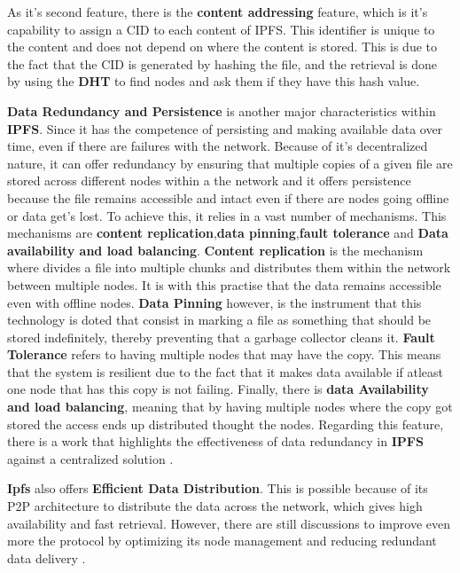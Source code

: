 As it's second feature, there is the \textbf{content addressing} feature, which is it's capability to assign a CID to each content of IPFS. This identifier is unique to the content and does not depend on where the content is stored. This is due to the fact that the CID is generated by hashing the file, and the retrieval is done by using the \textbf{DHT} to find nodes and ask them if they have this hash value.

\textbf{Data Redundancy and Persistence} is another major characteristics within \textbf{IPFS}. Since it has the competence of persisting and making available data over time, even if there are failures with the network. Because of it's decentralized nature, it can offer redundancy by ensuring that multiple copies of a given file are stored across different nodes within a the network and it offers persistence because the file remains accessible and intact even if there are nodes going offline or data get's lost. To achieve this, it relies in a vast number of mechanisms. This mechanisms are \textbf{content replication},\textbf{data pinning},\textbf{fault tolerance} and \textbf{Data availability and load balancing}. \textbf{Content replication} is the mechanism where  divides a file into multiple chunks and distributes them within the network between multiple nodes. It is with this practise that the data remains accessible even with offline nodes. \textbf{Data Pinning} however, is the instrument that this technology is doted that consist in marking a file as something that should be stored indefinitely, thereby preventing that a garbage collector cleans it. \textbf{Fault Tolerance} refers to having multiple nodes that may have the copy. This means that the system is resilient due to the fact that it makes data available if atleast one node that has this copy is not failing. Finally, there is \textbf{data Availability and load balancing}, meaning that by having multiple nodes where the copy got stored the access ends up distributed thought the nodes. Regarding this feature, there is a work that highlights the effectiveness of data redundancy in \textbf{IPFS} against a centralized solution \cite{ipfs-persistence}.

\textbf{Ipfs} also offers \textbf{Efficient Data Distribution}. This is possible because of its P2P architecture to distribute the data across the network, which gives high availability and fast retrieval. However, there are still discussions to improve even more the protocol by optimizing its node management and reducing redundant data delivery \cite{ipfs-optimization}.

